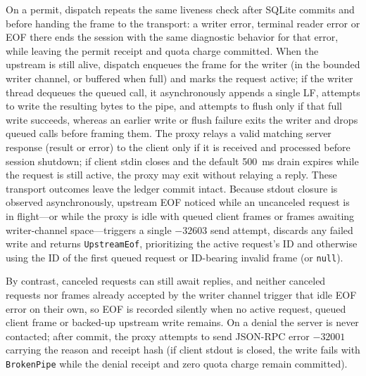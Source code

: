 \documentclass[10pt,twocolumn]{article}
\theoremstyle{plain}
\theoremstyle{definition}
\begin{document}
On a permit, dispatch repeats the same liveness check after SQLite commits and before handing the frame to the transport: a writer error, terminal reader error or EOF there ends the session with the same diagnostic behavior for that error, while leaving the permit receipt and quota charge committed. When the upstream is still alive, dispatch enqueues the frame for the writer (in the bounded writer channel, or buffered when full) and marks the request active; if the writer thread dequeues the queued call, it asynchronously appends a single LF, attempts to write the resulting bytes to the pipe, and attempts to flush only if that full write succeeds, whereas an earlier write or flush failure exits the writer and drops queued calls before framing them. The proxy relays a valid matching server response (result or error) to the client only if it is received and processed before session shutdown; if client stdin closes and the default 500~ms drain expires while the request is still active, the proxy may exit without relaying a reply. These transport outcomes leave the ledger commit intact. Because stdout closure is observed asynchronously, upstream EOF noticed while an uncanceled request is in flight---or while the proxy is idle with queued client frames or frames awaiting writer-channel space---triggers a single $-32603$ send attempt, discards any failed write and returns \texttt{UpstreamEof}, prioritizing the active request's ID and otherwise using the ID of the first queued request or ID-bearing invalid frame (or \texttt{null}).

By contrast, canceled requests can still await replies, and neither canceled requests nor frames already accepted by the writer channel trigger that idle EOF error on their own, so EOF is recorded silently when no active request, queued client frame or backed-up upstream write remains. On a denial the server is never contacted; after commit, the proxy attempts to send JSON-RPC error $-32001$ carrying the reason and receipt hash (if client stdout is closed, the write fails with \texttt{BrokenPipe} while the denial receipt and zero quota charge remain committed).
\end{document}
